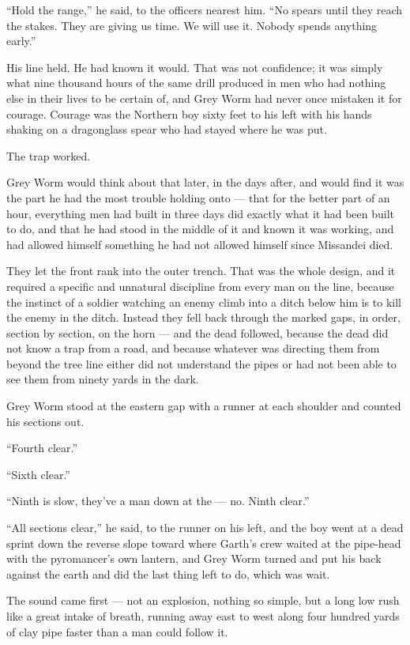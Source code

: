 “Hold the range,” he said, to the officers nearest him. “No spears until they reach the stakes. They are giving us time. We will use it. Nobody spends anything early.”

His line held. He had known it would. That was not confidence; it was simply what nine thousand hours of the same drill produced in men who had nothing else in their lives to be certain of, and Grey Worm had never once mistaken it for courage. Courage was the Northern boy sixty feet to his left with his hands shaking on a dragonglass spear who had stayed where he was put.

\sceneBreak

The trap worked.

Grey Worm would think about that later, in the days after, and would find it was the part he had the most trouble holding onto — that for the better part of an hour, everything men had built in three days did exactly what it had been built to do, and that he had stood in the middle of it and known it was working, and had allowed himself something he had not allowed himself since Missandei died.

They let the front rank into the outer trench. That was the whole design, and it required a specific and unnatural discipline from every man on the line, because the instinct of a soldier watching an enemy climb into a ditch below him is to kill the enemy in the ditch. Instead they fell back through the marked gaps, in order, section by section, on the horn — and the dead followed, because the dead did not know a trap from a road, and because whatever was directing them from beyond the tree line either did not understand the pipes or had not been able to see them from ninety yards in the dark.

Grey Worm stood at the eastern gap with a runner at each shoulder and counted his sections out.

“Fourth clear.”

“Sixth clear.”

“Ninth is slow, they’ve a man down at the — no. Ninth clear.”

“All sections clear,” he said, to the runner on his left, and the boy went at a dead sprint down the reverse slope toward where Garth’s crew waited at the pipe-head with the pyromancer’s own lantern, and Grey Worm turned and put his back against the earth and did the last thing left to do, which was wait.

The sound came first — not an explosion, nothing so simple, but a long low rush like a great intake of breath, running away east to west along four hundred yards of clay pipe faster than a man could follow it.

